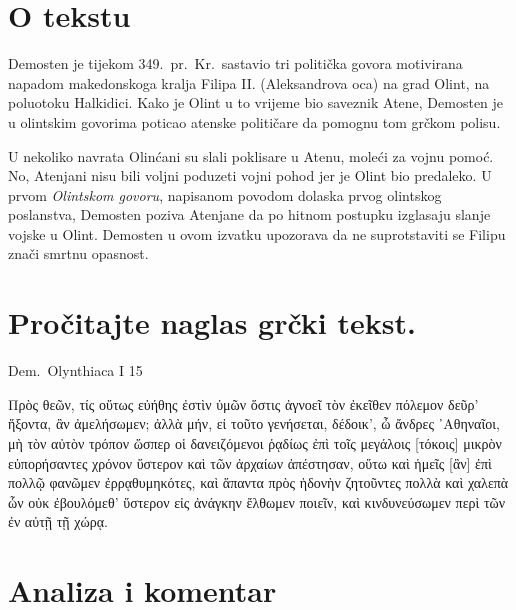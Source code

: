 


\section*{O tekstu}

Demosten je tijekom 349.~pr.~Kr.\ sastavio tri politička govora motivirana napadom makedonskoga kralja Filipa II. (Aleksandrova oca) na grad Olint, na poluotoku Halkidici. Kako je Olint u to vrijeme bio saveznik Atene, Demosten je u olintskim govorima poticao atenske političare da pomognu tom grčkom polisu.

U nekoliko navrata Olinćani su slali poklisare u Atenu, moleći za vojnu pomoć. No, Atenjani nisu bili voljni poduzeti vojni pohod jer je Olint bio predaleko. U prvom \textit{Olintskom govoru}, napisanom povodom dolaska prvog olintskog poslanstva, Demosten poziva Atenjane da po hitnom postupku izglasaju slanje vojske u Olint. Demosten u ovom izvatku upozorava da ne suprotstaviti se Filipu znači smrtnu opasnost.


\section*{Pročitajte naglas grčki tekst.}

Dem.\ Olynthiaca I 15

\medskip

{\large
\begin{greek}
\noindent Πρὸς θεῶν, τίς οὕτως εὐήθης ἐστὶν ὑμῶν ὅστις ἀγνοεῖ τὸν ἐκεῖθεν πόλεμον δεῦρ'  ἥξοντα, ἂν ἀμελήσωμεν; ἀλλὰ μήν, εἰ τοῦτο γενήσεται, δέδοικ', ὦ ἄνδρες ᾿Αθηναῖοι, μὴ τὸν αὐτὸν τρόπον ὥσπερ οἱ δανειζόμενοι ῥᾳδίως ἐπὶ τοῖς μεγάλοις [τόκοις] μικρὸν εὐπορήσαντες χρόνον ὕστερον καὶ τῶν ἀρχαίων ἀπέστησαν, οὕτω καὶ ἡμεῖς [ἂν] ἐπὶ πολλῷ φανῶμεν ἐρρᾳθυμηκότες, καὶ ἅπαντα πρὸς ἡδονὴν ζητοῦντες πολλὰ καὶ χαλεπὰ ὧν οὐκ ἐβουλόμεθ' ὕστερον εἰς ἀνάγκην ἔλθωμεν ποιεῖν, καὶ κινδυνεύσωμεν περὶ τῶν ἐν αὐτῇ τῇ χώρᾳ.

\end{greek}
}

\section*{Analiza i komentar}

